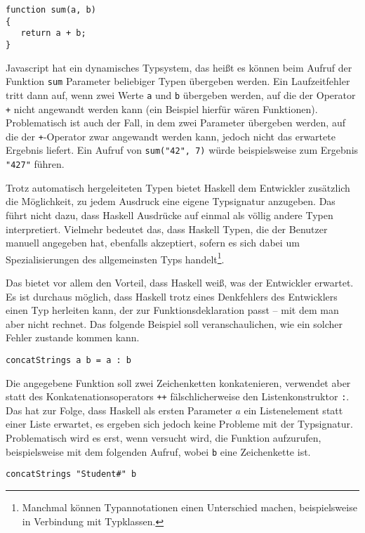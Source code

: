 \begin{verbatim}
function sum(a, b)
{
   return a + b;
}
\end{verbatim}

Javascript hat ein dynamisches Typsystem, das heißt es können beim Aufruf der Funktion \texttt{sum} Parameter beliebiger Typen
übergeben werden. Ein Laufzeitfehler tritt dann auf, wenn zwei Werte \texttt{a} und \texttt{b} übergeben werden, auf die
der Operator \texttt{+} nicht angewandt werden kann (ein Beispiel hierfür wären Funktionen). Problematisch ist auch der Fall, in
dem zwei Parameter übergeben werden, auf die der \texttt{+}-Operator zwar angewandt werden kann, jedoch nicht das erwartete
Ergebnis liefert. Ein Aufruf von \texttt{sum("42", 7)} würde beispielsweise zum Ergebnis \texttt{"427"} führen.

Trotz automatisch hergeleiteten Typen bietet Haskell dem Entwickler zusätzlich die Möglichkeit, zu jedem Ausdruck eine eigene
Typsignatur anzugeben. Das führt nicht dazu,
dass Haskell Ausdrücke auf einmal als völlig andere Typen interpretiert. Vielmehr bedeutet das, dass Haskell Typen, die der
Benutzer manuell angegeben hat, ebenfalls akzeptiert, sofern es sich dabei um Spezialisierungen des allgemeinsten Typs handelt\footnote{Manchmal können Typannotationen einen Unterschied machen, beispielsweise in Verbindung mit Typklassen.}.

Das bietet vor allem den Vorteil, dass Haskell weiß, was der Entwickler erwartet. Es ist durchaus möglich, dass Haskell trotz eines
Denkfehlers des Entwicklers einen Typ herleiten kann, der zur Funk\-tions\-de\-kla\-rati\-on passt -- mit dem man aber nicht rechnet.
Das folgende Beispiel soll veranschaulichen, wie ein solcher Fehler zustande kommen kann.

\begin{verbatim}
concatStrings a b = a : b
\end{verbatim}

Die angegebene Funktion soll zwei Zeichenketten konkatenieren, verwendet aber statt des Konkatenationsoperators \texttt{++} fälschlicherweise den
Listenkonstruktor \texttt{:}. Das hat zur Folge, dass Haskell als ersten Parameter $a$ ein Listenelement statt einer Liste erwartet,
es ergeben sich jedoch keine Probleme mit der Typsignatur. Problematisch wird es erst, wenn versucht wird, die Funktion
aufzurufen, beispielsweise mit dem folgenden Aufruf, wobei \texttt{b} eine Zeichenkette ist.

\begin{verbatim}
concatStrings "Student#" b
\end{verbatim}

